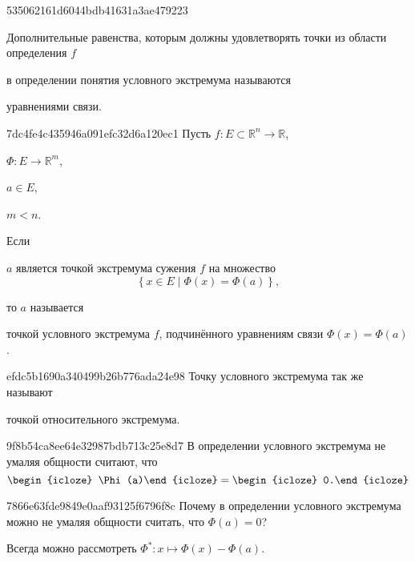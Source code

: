 \begin{note}{535062161d6044bdb41631a3ae479223}
    \begin{icloze}{2}Дополнительные равенства, которым должны удовлетворять точки из области определения \({ f }\)\end{icloze} в определении понятия условного экстремума называются \begin{icloze}{1}уравнениями связи.\end{icloze}
\end{note}

\begin{note}{7dc4fe4c435946a091efc32d6a120ec1}
    Пусть \({ f : E \subset \mathbb R^{n} \to \mathbb R }\), \begin{icloze}{4}\({ \Phi : E \to \mathbb R^{m} }\),\end{icloze} \({ a \in E }\), \begin{icloze}{3}\({ m < n }\).\end{icloze}
    Если
    \begin{icloze}{1}
        \({ a }\) является точкой экстремума сужения \({ f }\) на множество
        \[
            \left\{ x \in E \mid \Phi(x) = \Phi(a) \right\},
        \]
    \end{icloze}
    то \({ a }\) называется \begin{icloze}{2}точкой условного экстремума \({ f }\), подчинённого уравнениям связи \({ \Phi(x) = \Phi(a) }\).\end{icloze}
\end{note}

\begin{note}{efdc5b1690a340499b26b776ada24e98}
    Точку условного экстремума так же называют \begin{icloze}{1}точкой относительного экстремума.\end{icloze}
\end{note}

\begin{note}{9f8b54ca8ee64e32987bdb713c25e8d7}
    В определении условного экстремума не умаляя общности считают, что
    \[
        \begin{icloze}{2}\Phi(a)\end{icloze} = \begin{icloze}{1}0.\end{icloze}
    \]
\end{note}

\begin{note}{7866e63fde9849e0aaf93125f6796f8c}
    Почему в определении условного экстремума можно не умаляя общности считать, что \({ \Phi(a) = 0 }\)?

    \begin{cloze}{1}
        Всегда можно рассмотреть \({ \Phi^* : x \mapsto \Phi(x) - \Phi(a) }\).
    \end{cloze}
\end{note}


